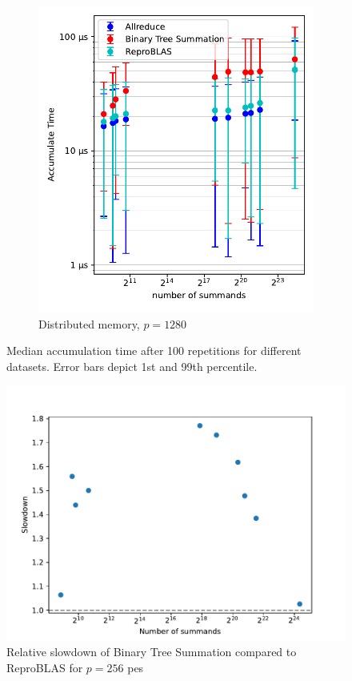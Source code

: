 \begin{figure}
\begin{subfigure}{0.49\textwidth}
\includegraphics[scale=0.72]{figures/benchmarkScatter1280.pdf}
\caption{Distributed memory, $p=1280$}
\label{fig:benchmarkOverview1280}
\end{subfigure}

\caption[Median accumulation time after 100 repetitions for different datasets.]{Median accumulation time after 100 repetitions for different datasets. Error bars depict 1st and 99th percentile.}
\label{fig:benchmarkOverview}
\end{figure}

\begin{figure}
\centering
\includegraphics[scale=0.75]{figures/slowdownPlot.pdf}
\caption{Relative slowdown of Binary Tree Summation compared to ReproBLAS for $p=256$ \glspl{pe}}
\label{fig:slowdownPlot}
\end{figure}

